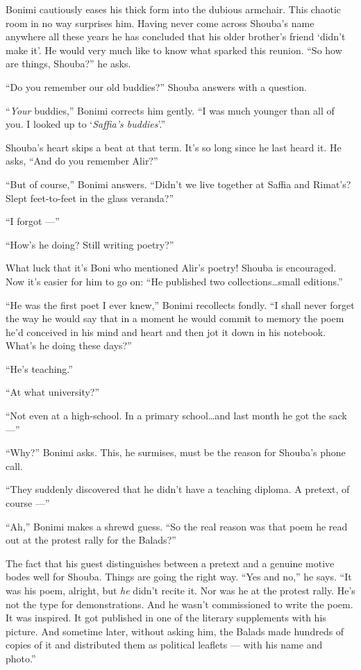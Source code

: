 \documentclass[twoside,11pt,openany]{book}
\begin{document}
Bonimi cautiously eases his thick form into the dubious armchair. This chaotic room in no way surprises him. Having
never come across Shouba's name anywhere all these years he has concluded that his older brother's friend `didn't
make it{}'. He would very much like to know what sparked this reunion. ``So how are things,
Shouba?'' he asks.

``Do you remember our old buddies?'' Shouba answers with a question.

``\textit{Your} buddies,'' Bonimi corrects him gently. ``I was much younger than all of you. I looked up to
`\textit{Saffia's buddies}'.''

Shouba's heart skips a beat at that term. It's so long since he last heard it. He asks, ``And do you
remember Alir?''

``But of course,'' Bonimi answers. ``Didn't we live together at Saffia and
Rimat's? Slept feet-to-feet in the glass veranda?''

``I forgot ---''

``How's he doing? Still writing poetry?''

What luck that it's Boni who mentioned Alir's poetry! Shouba is encouraged. Now it's easier for him to go on:
``He published two collections{\ldots}small{ }editions.''

``He was the first poet I ever knew,'' Bonimi recollects fondly. ``I shall never
forget the way he would say that in a moment he would commit to memory the poem he'd conceived in his mind and heart
and then jot it down in his notebook. What's he doing these days?''

``He's teaching.''

``At what university?''

``Not even {at} a high-school.{  }{In a} primary
school{\ldots}and last month he got the sack ---''

``Why?'' Bonimi asks. This, he surmises, must be the reason for Shouba's phone call.

``They suddenly discovered that he didn't have a teaching diploma. A pretext, of course ---''

``Ah,'' Bonimi makes a shrewd guess. ``So the real reason was that poem he read
out at the protest rally for the Balads?''

The fact that his guest distinguishes between a pretext and a genuine motive bodes well for Shouba. Things are going the
right way. ``Yes and no,'' he says. ``It was his poem, alright, but \textit{he}
didn't recite it. Nor was he at the protest rally. He's not the type for demonstrations. And he wasn't commissioned to
write the poem. It was inspired. It got published in one of the literary supplements with his picture. And sometime
later, without asking him, the Balads made hundreds of copies of it and distributed them as political leaflets ---
with his name and photo.''
\end{document}
